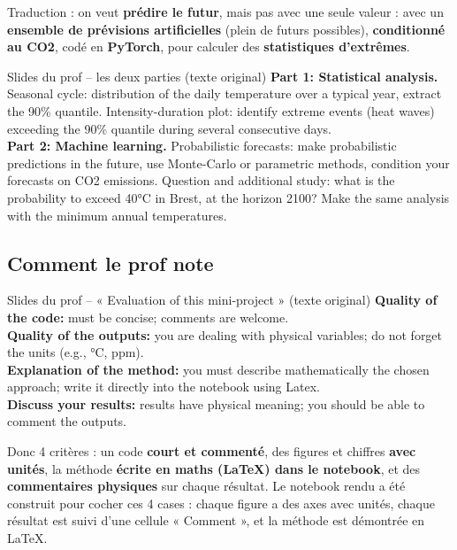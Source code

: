 \documentclass[11pt,a4paper]{article}
\begin{document}
Traduction : on veut \textbf{prédire le futur}, mais pas avec une seule valeur : avec un \textbf{ensemble de prévisions artificielles} (plein de futurs possibles), \textbf{conditionné au CO2}, codé en \textbf{PyTorch}, pour calculer des \textbf{statistiques d'extrêmes}.

\begin{prof}{Slides du prof -- les deux parties (texte original)}
\textbf{Part 1: Statistical analysis.} Seasonal cycle: distribution of the daily temperature over a typical year, extract the 90\% quantile. Intensity-duration plot: identify extreme events (heat waves) exceeding the 90\% quantile during several consecutive days.\\[3pt]
\textbf{Part 2: Machine learning.} Probabilistic forecasts: make probabilistic predictions in the future, use Monte-Carlo or parametric methods, condition your forecasts on CO2 emissions. Question and additional study: what is the probability to exceed 40°C in Brest, at the horizon 2100? Make the same analysis with the minimum annual temperatures.
\end{prof}

\subsection{Comment le prof note}

\begin{prof}{Slides du prof -- « Evaluation of this mini-project » (texte original)}
\textbf{Quality of the code:} must be concise; comments are welcome.\\
\textbf{Quality of the outputs:} you are dealing with physical variables; do not forget the units (e.g., °C, ppm).\\
\textbf{Explanation of the method:} you must describe mathematically the chosen approach; write it directly into the notebook using Latex.\\
\textbf{Discuss your results:} results have physical meaning; you should be able to comment the outputs.
\end{prof}

Donc 4 critères : un code \textbf{court et commenté}, des figures et chiffres \textbf{avec unités}, la méthode \textbf{écrite en maths (LaTeX) dans le notebook}, et des \textbf{commentaires physiques} sur chaque résultat. Le notebook rendu a été construit pour cocher ces 4 cases : chaque figure a des axes avec unités, chaque résultat est suivi d'une cellule « Comment », et la méthode est démontrée en LaTeX.
\end{document}
